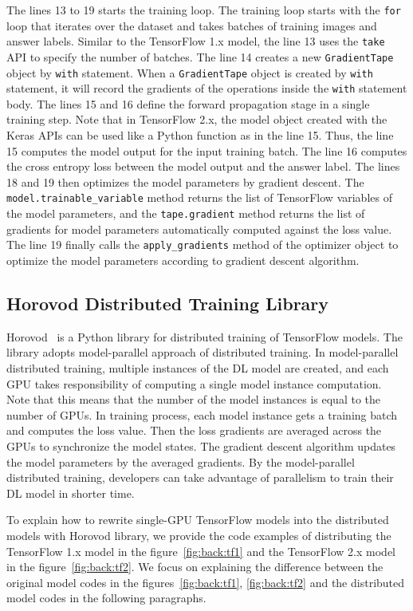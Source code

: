 The lines 13 to 19 starts the training loop.
The training loop starts with the {\tt for} loop that iterates over the dataset
and takes batches of training images and answer labels.
Similar to the TensorFlow 1.x model,
the line 13 uses the {\tt take} API to specify the number of batches.
The line 14 creates a new {\tt GradientTape} object by {\tt with} statement.
When a {\tt GradientTape} object is created by {\tt with} statement,
it will record the gradients of the operations inside the {\tt with}
statement body.
The lines 15 and 16 define the forward propagation stage in a single
training step.
Note that in TensorFlow 2.x, the model object created with the Keras APIs can be
used like a Python function as in the line 15.
Thus, the line 15 computes the model output for the input training batch. 
The line 16 computes the cross entropy loss between the model output and
the answer label.
The lines 18 and 19 then optimizes the model parameters by gradient descent. 
The {\tt model.trainable\_variable} method returns the list of 
TensorFlow variables of the model parameters,
and the {\tt tape.gradient} method returns the list of
gradients for model parameters automatically computed against the
loss value.
The line 19 finally calls the {\tt apply\_gradients} method of the optimizer
object to optimize the model parameters according to gradient descent algorithm.


\subsection{Horovod Distributed Training Library}

Horovod~\cite{sergeev2018horovod} is a Python library for distributed training 
of TensorFlow models. The library adopts model-parallel approach of distributed 
training. 
In model-parallel distributed training, multiple instances of the DL model
are created, and each GPU takes responsibility of computing a single model
instance computation. %
Note that this means that the number of the model instances 
is equal to the number of GPUs.
In training process, each model instance gets a training batch and computes the
loss value. Then the loss gradients are averaged across the GPUs to synchronize 
the model states. The gradient descent algorithm updates the model parameters by
the averaged gradients.
By the model-parallel distributed training, developers can take advantage of
parallelism to train their DL model in shorter time.

To explain how to rewrite single-GPU TensorFlow models into the distributed 
models with Horovod library, we provide the code examples of distributing 
the TensorFlow 1.x model in the figure~\ref{fig:back:tf1} and the TensorFlow
2.x model in the figure~\ref{fig:back:tf2}.
We focus on explaining the difference between the original model codes in
the figures~\ref{fig:back:tf1}, \ref{fig:back:tf2} and the distributed 
model codes in the following paragraphs.

